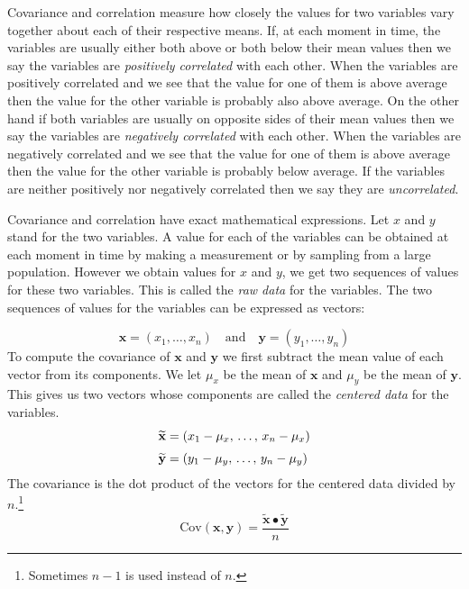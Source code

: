 Covariance and correlation measure how 
closely the values for two variables vary together about each of their respective means. 
If, at each moment in time, the variables are usually either both above or both 
below their mean values then we say the variables are \emph{positively correlated}
with each other. When the variables are positively correlated and we see that
the value for one of them is above average then the value for the other 
variable is probably also above average. On the other hand if both variables 
are usually on opposite sides of their mean values then we say the variables 
are \emph{negatively correlated} with each other. When the variables are negatively 
correlated and we see that the value for one of them is above average then the 
value for the other variable is probably below average. If the variables are
neither positively nor negatively correlated then we say they are \emph{uncorrelated}.

   Covariance and correlation have exact mathematical expressions. Let $x$ and 
$y$ stand for the two variables. A value for each of the variables can be 
obtained at each moment in time by making a measurement or by sampling from a 
large population. However we obtain values for $x$ and $y$, we get two 
sequences of values for these two variables. This is called the 
\emph{raw data} for the variables. The two sequences of values for the 
variables can be expressed as vectors:

\begin{equation}
\mathbf{x} = (x_1, \dots, x_n) \quad \mbox{and} \quad 
\mathbf{y} = (y_1, \dots, y_n)
\end{equation}
To compute the covariance of $\mathbf{x}$ and $\mathbf{y}$ we first subtract 
the mean value of each vector from its components. We let $\mu_x$ be the 
mean of $\mathbf{x}$ and $\mu_y$ be the mean of $\mathbf{y}$. This gives 
us two vectors whose components are called the \emph{centered data} for the 
variables.
\begin{align}
\widetilde{\mathbf{x}} &= (x_1 - \mu_x, \, \dots, \, x_n - \mu_x) \notag \\[1mm]
\widetilde{\mathbf{y}} &= (y_1 - \mu_y, \, \dots, \, y_n - \mu_y)
\end{align}
The covariance is the dot product of the vectors for the centered data divided 
by $n$.\footnote{Sometimes $n-1$ is used instead of $n$.}
\begin{equation}\label{E:covdef}
\mathrm{Cov}(\mathbf{x}, \mathbf{y}) = \frac{\widetilde{\mathbf{x}} \bullet 
                                             \widetilde{\mathbf{y}}}{n} 
\end{equation}

